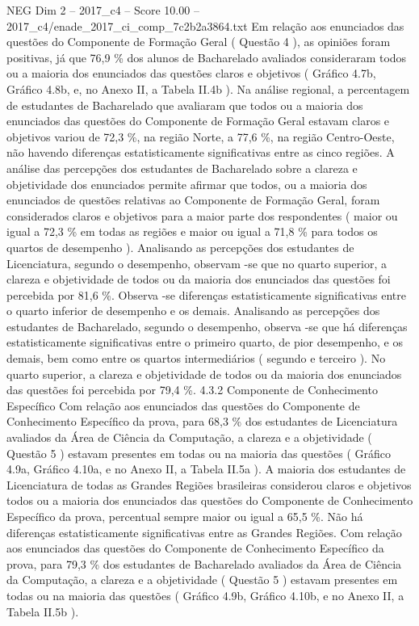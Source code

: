 \begin{textsample}{NEG Dim 2 – 2017\_c4 – Score 10.00 – 2017\_c4/enade\_2017\_ci\_comp\_7c2b2a3864.txt}
Em relação aos enunciados das questões do Componente de Formação Geral ( Questão 4 ), as opiniões foram positivas, já que 76,9 \% dos alunos de Bacharelado avaliados consideraram todos ou a maioria dos enunciados das questões claros e objetivos ( Gráfico 4.7b, Gráfico 4.8b, e, no Anexo II, a Tabela II.4b ).
Na análise regional, a percentagem de estudantes de Bacharelado que avaliaram que todos ou a maioria dos enunciados das questões do Componente de Formação Geral estavam claros e objetivos variou de 72,3 \%, na região Norte, a 77,6 \%, na região Centro-Oeste, não havendo diferenças estatisticamente significativas entre as cinco regiões.
A análise das percepções dos estudantes de Bacharelado sobre a clareza e objetividade dos enunciados permite afirmar que todos, ou a maioria dos enunciados de questões relativas ao Componente de Formação Geral, foram considerados claros e objetivos para a maior parte dos respondentes ( maior ou igual a 72,3 \% em todas as regiões e maior ou igual a 71,8 \% para todos os quartos de desempenho ).
Analisando as percepções dos estudantes de Licenciatura, segundo o desempenho, observam -se que no quarto superior, a clareza e objetividade de todos ou da maioria dos enunciados das questões foi percebida por 81,6 \%.
Observa -se diferenças estatisticamente significativas entre o quarto inferior de desempenho e os demais.
Analisando as percepções dos estudantes de Bacharelado, segundo o desempenho, observa -se que há diferenças estatisticamente significativas entre o primeiro quarto, de pior desempenho, e os demais, bem como entre os quartos intermediários ( segundo e terceiro ).
No quarto superior, a clareza e objetividade de todos ou da maioria dos enunciados das questões foi percebida por 79,4 \%. 4.3.2 Componente de Conhecimento Específico Com relação aos enunciados das questões do Componente de Conhecimento Específico da prova, para 68,3 \% dos estudantes de Licenciatura avaliados da Área de Ciência da Computação, a clareza e a objetividade ( Questão 5 ) estavam presentes em todas ou na maioria das questões ( Gráfico 4.9a, Gráfico 4.10a, e no Anexo II, a Tabela II.5a ).
A maioria dos estudantes de Licenciatura de todas as Grandes Regiões brasileiras considerou claros e objetivos todos ou a maioria dos enunciados das questões do Componente de Conhecimento Específico da prova, percentual sempre maior ou igual a 65,5 \%.
Não há diferenças estatisticamente significativas entre as Grandes Regiões.
Com relação aos enunciados das questões do Componente de Conhecimento Específico da prova, para 79,3 \% dos estudantes de Bacharelado avaliados da Área de Ciência da Computação, a clareza e a objetividade ( Questão 5 ) estavam presentes em todas ou na maioria das questões ( Gráfico 4.9b, Gráfico 4.10b, e no Anexo II, a Tabela II.5b ).

\end{textsample}
